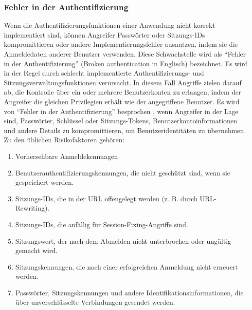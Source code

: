 \subsubsection{Fehler in der Authentifizierung}

Wenn die Authentifizierungsfunktionen  einer Anwendung nicht korrekt
implementiert sind, können Angreifer Passwörter oder Sitzungs-IDs
kompromittieren oder andere Implementierungsfehler ausnutzen, indem
sie die Anmeldedaten anderer Benutzer verwenden. Diese Schwachstelle
wird als ``Fehler in der Authentifizierung'' (Broken authentication
in Englisch) bezeichnet. Es wird in der Regel durch schlecht
implementierte Authentifizierungs- und Sitzungsverwaltungsfunktionen
verursacht. In diesem Fall Angriffe zielen darauf ab, die Kontrolle
über ein oder mehrere Benutzerkonten zu erlangen, indem der Angreifer
die gleichen Privilegien erhält wie der angegriffene Benutzer.
Es wird von ``Fehler in der Authentifizierung'' besprochen ,
wenn Angreifer in der Lage sind, Passwörter, Schlüssel oder
Sitzungs-Tokens, Benutzerkontoinformationen und andere
Details zu kompromittieren, um Benutzeridentitäten zu übernehmen.
Zu den üblichen Risikofaktoren gehören:


\begin{enumerate}
    \item Vorhersehbare Anmeldekennungen
    \item Benutzerauthentifizierungskennungen, die nicht geschützt sind, wenn sie gespeichert werden.
    \item Sitzungs-IDs, die in der URL offengelegt werden (z. B. durch URL-Rewriting).
    \item Sitzungs-IDs, die anfällig für Session-Fixing-Angriffe sind.
    \item Sitzungswert, der nach dem Abmelden nicht unterbrochen oder ungültig gemacht wird.
    \item Sitzungskennungen, die nach einer erfolgreichen Anmeldung nicht erneuert werden.
    \item Passwörter, Sitzungskennungen und andere Identifikationsinformationen, die über unverschlüsselte Verbindungen gesendet werden.
\end{enumerate}